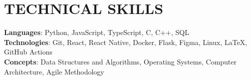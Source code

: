 \section{\textbf {\large TECHNICAL SKILLS}}
    \begin{itemize}[leftmargin=0.15in, label={}]
	\small{\item{
		\textbf{Languages}{: Python, JavaScript, TypeScript, C, C++, SQL} \\
		\textbf{Technologies}{: Git, React, React Native, Docker, Flask, Figma, Linux, LaTeX, GitHub Actions} \\
		\textbf{Concepts}{: Data Structures and Algorithms, Operating Systems, Computer Architecture, Agile Methodology}
	}}
    \end{itemize}